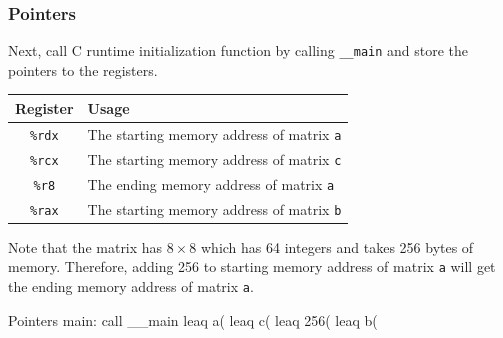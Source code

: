 \documentclass[12pt, a4paper]{article}
\begin{document}

    \pagebreak
            \subsubsection{Pointers}
                Next, call C runtime initialization function by calling \texttt{\_\_main}
                and store the pointers to the registers.
                \begin{table}[h]
                    \centering
                    \begin{tabular}{|c|l|}
                        \hline
                        Register & Usage \\
                        \hline \hline
                        \texttt{\%rdx} & The starting memory address of matrix \texttt{a} \\
                        \texttt{\%rcx} & The starting memory address of matrix \texttt{c} \\
                        \texttt{\%r8} & The ending memory address of matrix \texttt{a} \\
                        \texttt{\%rax} & The starting memory address of matrix \texttt{b} \\
                        \hline
                    \end{tabular}
                \end{table}

                Note that the matrix has $8 $ which has 64 integers and takes 256 bytes of memory.
                Therefore, adding 256 to starting memory address of matrix \texttt{a} will get
                the ending memory address of matrix \texttt{a}.

                \begin{codeblock}[minted language=asm]{Pointers}
                    main:
                        call    __main
                        leaq    a(%
                        leaq    c(%
                        leaq    256(%
                        leaq    b(%
                \end{codeblock}
\end{document}
